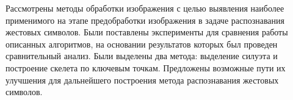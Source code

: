 Рассмотрены методы обработки изображения с целью выявления наиболее применимого на этапе предобработки изображения в задаче распознавания жестовых символов. Были поставлены эксперименты для сравнения работы описанных алгоритмов, на основании результатов которых был проведен сравнительный анализ. Были выделены два метода: выделение силуэта и построение скелета по ключевым точкам. Предложены возможные пути их улучшения для дальнейшего построения метода распознавания жестовых символов.
